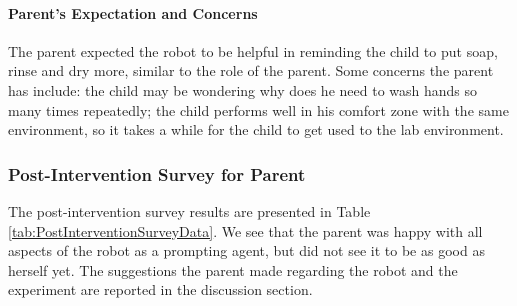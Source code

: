 \paragraph{Parent's Expectation and Concerns}
The parent expected the robot to be helpful in reminding the child to put soap, rinse and dry more, similar to the role of the parent.  Some concerns the parent has include: the child may be wondering why does he need to wash hands so many times repeatedly; the child performs well in his comfort zone with the same environment, so it takes a while for the child to get used to the lab environment.


\subsubsection{Post-Intervention Survey for Parent}
The post-intervention survey results are presented in Table \ref{tab:PostInterventionSurveyData}.  We see that the parent was happy with all aspects of the robot as a prompting agent, but did not see it to be as good as herself yet.  The suggestions the parent made regarding the robot and the experiment are reported in the discussion section.

